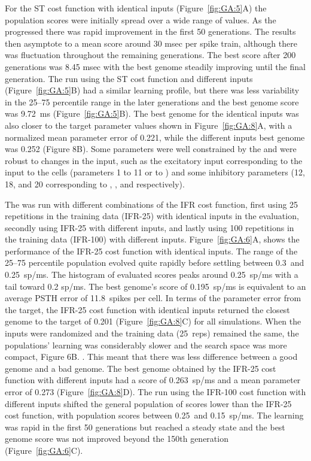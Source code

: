 For the ST cost function with identical {\ANF} inputs
(Figure~\ref{fig:GA:5}A) the population scores were initially spread over
a wide range of values. As the {\GA} progressed there was rapid
improvement in the first 50 generations. The results then asymptote to
a mean score around 30 msec per spike train, although there was
fluctuation throughout the remaining generations.  The best score
after 200 generations was 8.45 msec with the best genome steadily
improving until the final generation.  The {\GA} run using the ST cost
function and different {\ANF} inputs (Figure~\ref{fig:GA:5}B) had a similar
learning profile, but there was less variability in the 25--75
percentile range in the later generations and the best genome score
was 9.72~ms (Figure~\ref{fig:GA:5}B).  The best genome for the identical
inputs was also closer to the target parameter values shown in
Figure~\ref{fig:GA:8}A, with a normalized mean parameter error of 0.221,
while the different inputs {\GAs} best genome was 0.252 (Figure
8B). Some parameters were well constrained by the {\GA} and were robust
to changes in the input, such as the excitatory input corresponding to
the {\ANF} input to the {\CN} cells (parameters 1 to 11 or \wANFTS to
\wLSRGLG) and some inhibitory parameters (12, 18, and 20 corresponding
to \wDSTS, \wGLGTS, and \sGLGTS respectively).

\smallskip{} 

The {\GA} was run with different combinations of the IFR cost function,
first using 25 repetitions in the training data (IFR-25) with
identical {\ANF} inputs in the {\GA} evaluation, secondly using IFR-25 with
different {\ANF} inputs, and lastly using 100 repetitions in the training
data (IFR-100) with different {\ANF} inputs. Figure~\ref{fig:GA:6}A, shows
the {\GA} performance of the IFR-25 cost function with identical
inputs. The range of the 25--75 percentile population evolved quite
rapidly before settling between 0.3~and 0.25~sp/ms.  The histogram of
evaluated scores peaks around 0.25~sp/ms with a tail toward 0.2 sp/ms.
The best genome's score of 0.195~sp/ms is equivalent to an average
PSTH error of 11.8~spikes per cell. In terms of the parameter error
from the target, the IFR-25 cost function with identical inputs
returned the closest genome to the target of 0.201
(Figure~\ref{fig:GA:8}C) for all {\GA} simulations. When the inputs were
randomized and the training data (25~reps) remained the same, the {\GA}
populations' learning was considerably slower and the search space was
more compact, Figure 6B. . This meant that there was less difference between a good
genome and a bad genome.  The best genome obtained by the IFR-25 cost
function with different inputs had a score of 0.263~sp/ms and a mean
parameter error of 0.273 (Figure~\ref{fig:GA:8}D). The {\GA} run using the
IFR-100 cost function with different inputs shifted the general
population of {\GA} scores lower than the IFR-25 cost function, with
population scores between 0.25~and 0.15~sp/ms. The learning was rapid
in the first 50 generations but reached a steady state and the best
genome score was not improved beyond the 150th generation
(Figure~\ref{fig:GA:6}C).  %

